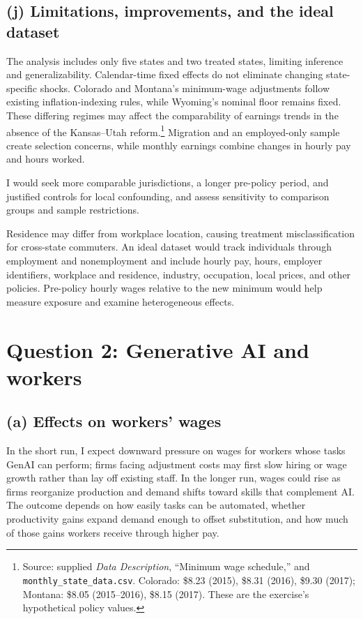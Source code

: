 \documentclass[12pt]{article}
\begin{document}
\subsection*{(j) Limitations, improvements, and the ideal dataset}
The analysis includes only five states and two treated states, limiting inference and generalizability. Calendar-time fixed effects do not eliminate changing state-specific shocks. Colorado and Montana’s minimum-wage adjustments follow existing inflation-indexing rules, while Wyoming’s nominal floor remains fixed. These differing regimes may affect the comparability of earnings trends in the absence of the Kansas–Utah reform.\footnote{Source: supplied \textit{Data Description}, ``Minimum wage schedule,'' and \texttt{monthly\_state\_data.csv}. Colorado: \$8.23 (2015), \$8.31 (2016), \$9.30 (2017); Montana: \$8.05 (2015--2016), \$8.15 (2017). These are the exercise's hypothetical policy values.} Migration and an employed-only sample create selection concerns, while monthly earnings combine changes in hourly pay and hours worked.

I would seek more comparable jurisdictions, a longer pre-policy period, and justified controls for local confounding, and assess sensitivity to comparison groups and sample restrictions.

Residence may differ from workplace location, causing treatment misclassification for cross-state commuters. An ideal dataset would track individuals through employment and nonemployment and include hourly pay, hours, employer identifiers, workplace and residence, industry, occupation, local prices, and other policies. Pre-policy hourly wages relative to the new minimum would help measure exposure and examine heterogeneous effects.

\clearpage

\section*{Question 2: Generative AI and workers}

\subsection*{(a) Effects on workers' wages}
In the short run, I expect downward pressure on wages for workers whose tasks GenAI can perform; firms facing adjustment costs may first slow hiring or wage growth rather than lay off existing staff. In the longer run, wages could rise as firms reorganize production and demand shifts toward skills that complement AI. The outcome depends on how easily tasks can be automated, whether productivity gains expand demand enough to offset substitution, and how much of those gains workers receive through higher pay.
\end{document}
